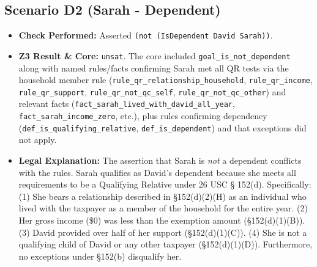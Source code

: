\documentclass[11pt, letterpaper]{article}
\begin{document}
\subsection{Scenario D2 (Sarah - Dependent)}
\begin{itemize}
    \item \textbf{Check Performed:} Asserted \texttt{(not (IsDependent David Sarah))}.
    \item \textbf{Z3 Result \& Core:} \texttt{unsat}. The core included \texttt{goal\_is\_not\_dependent} along with named rules/facts confirming Sarah met all QR tests via the household member rule (\texttt{rule\_qr\_relationship\_household}, \texttt{rule\_qr\_income}, \texttt{rule\_qr\_support}, \texttt{rule\_qr\_not\_qc\_self}, \texttt{rule\_qr\_not\_qc\_other}) and relevant facts (\texttt{fact\_sarah\_lived\_with\_david\_all\_year}, \texttt{fact\_sarah\_income\_zero}, etc.), plus rules confirming dependency (\texttt{def\_is\_qualifying\_relative}, \texttt{def\_is\_dependent}) and that exceptions did not apply.
    \item \textbf{Legal Explanation:} The assertion that Sarah is \textit{not} a dependent conflicts with the rules. Sarah qualifies as David's dependent because she meets all requirements to be a Qualifying Relative under 26 USC § 152(d). Specifically: (1) She bears a relationship described in §152(d)(2)(H) as an individual who lived with the taxpayer as a member of the household for the entire year. (2) Her gross income (\$0) was less than the exemption amount (§152(d)(1)(B)). (3) David provided over half of her support (§152(d)(1)(C)). (4) She is not a qualifying child of David or any other taxpayer (§152(d)(1)(D)). Furthermore, no exceptions under §152(b) disqualify her.
\end{itemize}
\end{document}
